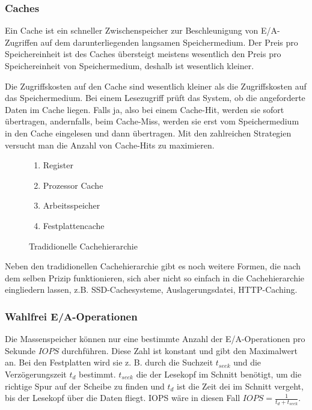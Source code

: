 

\subsubsection{Caches}
Ein Cache ist ein schneller Zwischenspeicher zur Beschleunigung von E/A-Zugriffen auf dem darunterliegenden langsamen Speichermedium. 
Der Preis pro Speichereinheit ist des Caches übersteigt meistens wesentlich den Preis pro Speichereinheit von Speichermedium, deshalb ist wesentlich kleiner.

Die Zugriffskosten auf den Cache sind wesentlich kleiner als die Zugriffskosten auf das Speichermedium. 
Bei einem Lesezugriff prüft das System, ob die angeforderte Daten im Cache liegen. 
Falls ja, also bei einem Cache-Hit, werden sie sofort übertragen, andernfalls, beim Cache-Miss, werden sie erst vom Speichermedium in den Cache eingelesen und dann übertragen. 
Mit den zahlreichen Strategien versucht man die Anzahl von Cache-Hits zu maximieren.  

\begin{figure}[h]
	\centering
	\begin{minipage}[t]{0.3\textwidth}
		\begin{enumerate}
			\item Register
			\item Prozessor Cache
			\item Arbeitsspeicher
			\item Festplattencache
		\end{enumerate}
	\end{minipage}
	\caption{Tradidionelle Cachehierarchie}
\end{figure}

Neben den tradidionellen Cachehierarchie gibt es noch weitere Formen, die nach dem selben Prizip funktionieren, sich aber nicht so einfach in die Cachehierarchie eingliedern lassen, z.B. SSD-Cachesysteme, Auslagerungsdatei, HTTP-Caching.

\subsubsection{Wahlfrei E/A-Operationen}
Die Massenspeicher können nur eine bestimmte Anzahl der E/A-Operationen pro Sekunde $IOPS$ durchführen. Diese Zahl ist konstant und gibt den Maximalwert an. Bei den Festplatten wird sie z. B. durch die Suchzeit $t_{seek}$ und die Verzögerungszeit $t_{d}$ bestimmt. $t_{seek}$ die der Lesekopf im Schnitt benötigt, um die richtige Spur auf der Scheibe zu finden und $t_d$ ist die Zeit dei im Schnitt vergeht, bis der Lesekopf über die Daten fliegt. IOPS wäre in diesen Fall $IOPS = \frac{1}{t_d + t_{seek}}$.

